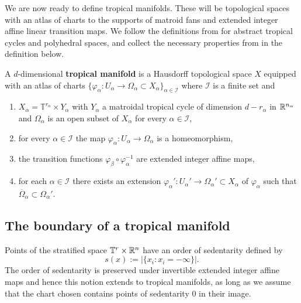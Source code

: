 We are now ready to define tropical manifolds. These will be topological spaces with an atlas of charts to the supports of matroid fans and extended integer affine linear  transition maps. 
We follow the definitions from  \cite[Section 7]{MikRau} for abstract tropical cycles and polyhedral spaces,
and collect the necessary properties from \cite[Definition 7.4.1]{MikRau} in the definition below. 

\begin{defi} \label{def:tropmanifold}
A $d$-dimensional \textbf{tropical manifold} is a Hausdorff topological space $X$ equipped with an atlas of charts  $\{\varphi_{\alpha} \colon U_{\alpha} \rightarrow \Omega_{\alpha} \subset X_{\alpha}\}_{{\alpha} \in \mathcal I}$ where $\mathcal I$ is a finite set 
and 
\begin{enumerate}
\item $X_{\alpha} = \mathbb{T}^{r_{\alpha}} \times Y_{\alpha}$ with $Y_{\alpha}$ a matroidal tropical cycle of dimension $d- r_{\alpha}$ in $\mathbb{R}^{n_{\alpha}}$ and $\Omega_\alpha$ is  an open subset of $X_{\alpha}$ for every $\alpha \in \mathcal I$, 
\item for every $\alpha \in \mathcal I$ the map $\varphi_{\alpha} \colon U_{\alpha} \rightarrow \Omega_{\alpha}$ is a homeomorphism, 
\item the transition functions $\varphi_{\beta} \circ \varphi_{\alpha}^{-1}$ are extended integer affine maps,
\item \label{closure} for each $\alpha \in \mathcal I$ there exists an extension $\varphi_{\alpha}' \colon U_{\alpha}' \rightarrow \Omega_{\alpha}' \subset X_{\alpha}$ of $\varphi_\alpha$ such that $\overline{\Omega}_{\alpha} \subset  \Omega_{\alpha}' $. 
\end{enumerate}
\end{defi}



\subsection{The boundary of a tropical manifold}
\label{sec:boundary}

Points of the stratified space $\mathbb{T}^r \times \mathbb{R}^n$ have an {order of sedentarity} defined by
$$s(x) := |\{ x_i : x_i = -\infty\}|.$$
The order of sedentarity is preserved under invertible extended integer affine maps and hence this notion extends to tropical manifolds, as long as we assume that the chart chosen contains points of sedentarity $0$ in their image. 

